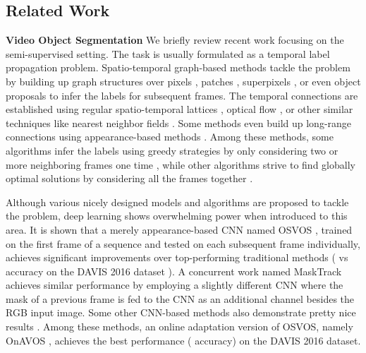 \documentclass[10pt,twocolumn,letterpaper]{article}
\begin{document}
\subsection{Related Work}

\noindent\textbf{Video Object Segmentation} We briefly review recent work focusing on the semi-supervised setting.
The task is usually formulated as a temporal label propagation problem.
Spatio-temporal graph-based methods tackle the problem by building up graph structures over
pixels \cite{TsaiBMVC10}, patches \cite{avinash2014seamseg}, superpixels \cite{grundmann2010efficient,tsai2016video}, 
or even object proposals \cite{perazzi2015fully} to infer the labels for subsequent frames.
The temporal connections are established using regular spatio-temporal lattices \cite{marki2016bilateral}, optical flow \cite{grundmann2010efficient},
or other similar techniques like nearest neighbor fields \cite{avinash2014seamseg}.
Some methods even build up long-range connections using appearance-based methods \cite{perazzi2015fully}.
Among these methods, some algorithms infer the labels using greedy strategies by only considering two or more neighboring frames one time \cite{fan2015jumpcut,marki2016bilateral,tsai2016video},
while other algorithms strive to find globally optimal solutions by considering all the frames together \cite{TsaiBMVC10,grundmann2010efficient,perazzi2015fully}.

Although various nicely designed models and algorithms are proposed to tackle the problem,
deep learning shows overwhelming power when introduced to this area. It is shown that a merely appearance-based CNN named OSVOS \cite{caelles2017one}, trained on the first frame
of a sequence and tested on each subsequent frame individually, achieves significant improvements over top-performing traditional methods ( vs  accuracy on the DAVIS 2016 dataset \cite{perazzi2016benchmark}). 
A concurrent work named MaskTrack \cite{perazzi2017learning} achieves similar performance by employing a slightly different CNN where the mask of
a previous frame is fed to the CNN as an additional channel besides the RGB input image.
Some other CNN-based methods also demonstrate pretty nice results \cite{jang2017online,jampani2017cvpr,shin2017pixel,cheng2017segflow,voigtlaender2017online}.
Among these methods, an online adaptation version of OSVOS, namely OnAVOS \cite{voigtlaender2017online}, achieves the best performance ( accuracy) on the DAVIS 2016 dataset.
\end{document}
